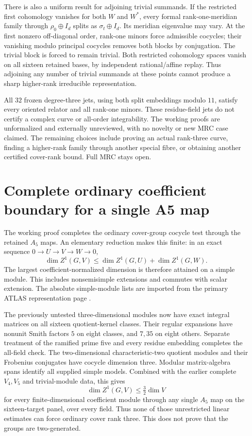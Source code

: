 \documentclass[11pt]{article}
\begin{document}
There is also a uniform result for adjoining trivial summands. If
the restricted first cohomology vanishes for both $W$ and $W^*$,
every formal rank-one-meridian family through $\rho_0\oplus I_d$
splits as $\sigma_t\oplus I_d$. Its meridian eigenvalue may vary.
At the first nonzero off-diagonal order, rank-one minors force
admissible cocycles; their vanishing modulo principal cocycles
removes both blocks by conjugation. The trivial block is forced to
remain trivial. Both restricted cohomology spaces vanish on all
sixteen retained bases, by independent rational/affine replay.
Thus adjoining any number of trivial summands at these points
cannot produce a sharp higher-rank irreducible representation.

All $32$ frozen degree-three jets, using both split embeddings
modulo $11$, satisfy every oriented relator and all rank-one
minors. These residue-field jets do not certify a complex curve or
all-order integrability. The working proofs are unformalized and
externally unreviewed, with no novelty or new MRC case claimed.
The remaining choices include proving an actual rank-three curve,
finding a higher-rank family through another special fibre, or
obtaining another certified cover-rank bound. Full MRC stays open.

\clearpage
\section{Complete ordinary coefficient boundary for a single A5 map}

The working proof
 completes the
ordinary cover-group cocycle test through the retained $A_5$ maps.
An elementary reduction makes this finite: in an exact sequence
$0\to U\to V\to W\to0$,
\[
 \dim Z^1(G,V)\le\dim Z^1(G,U)+\dim Z^1(G,W).
\]
The largest coefficient-normalized dimension is therefore attained
on a simple module. This includes nonsemisimple extensions and
commutes with scalar extension. The absolute simple-module lists
are imported from the primary ATLAS representation page \cite{atlas}.

The previously untested three-dimensional modules now have exact
integral matrices on all sixteen quotient-kernel classes. Their
regular expansions have nonunit Smith factors $5$ on eight classes,
and $7,35$ on eight others. Separate treatment of the ramified prime
five and every residue embedding completes the all-field check.
The two-dimensional characteristic-two quotient modules and their
Frobenius conjugates have cocycle dimension three. Modular
matrix-algebra spans identify all supplied simple models. Combined
with the earlier complete $V_4,V_5$ and trivial-module data, this gives
\[
 \dim Z^1(G,V)\le\tfrac32\dim V
\]
for every finite-dimensional coefficient module through any single
$A_5$ map on the sixteen-target panel, over every field. Thus none
of those unrestricted linear estimates can force ordinary cover
rank three. This does not prove that the groups are two-generated.
\end{document}
